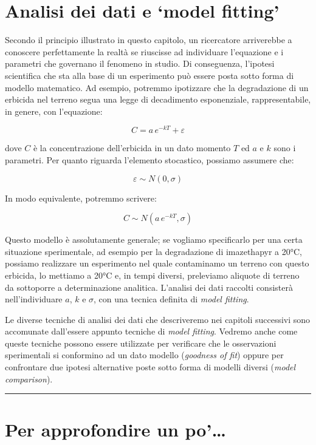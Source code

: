 \documentclass[a4paper,12pt,oneside]{book}
\begin{document}
\hypertarget{analisi-dei-dati-e-model-fitting}{%
\section{Analisi dei dati e `model fitting'}\label{analisi-dei-dati-e-model-fitting}}

Secondo il principio illustrato in questo capitolo, un ricercatore arriverebbe a conoscere perfettamente la realtà se riuscisse ad individuare l'equazione e i parametri che governano il fenomeno in studio. Di conseguenza, l'ipotesi scientifica che sta alla base di un esperimento può essere posta sotto forma di modello matematico. Ad esempio, potremmo ipotizzare che la degradazione di un erbicida nel terreno segua una legge di decadimento esponenziale, rappresentabile, in genere, con l'equazione:

\[ C= a \, e^{-k T} + \varepsilon\]

dove \(C\) è la concentrazione dell'erbicida in un dato momento \(T\) ed \(a\) e \(k\) sono i parametri. Per quanto riguarda l'elemento stocastico, possiamo assumere che:

\[ \varepsilon \sim N(0, \sigma)\]

In modo equivalente, potremmo scrivere:

\[ C \sim N(a \, e^{-k T}, \sigma)\]

Questo modello è assolutamente generale; se vogliamo specificarlo per una certa situazione sperimentale, ad esempio per la degradazione di imazethapyr a 20°C, possiamo realizzare un esperimento nel quale contaminamo un terreno con questo erbicida, lo mettiamo a 20°C e, in tempi diversi, preleviamo aliquote di terreno da sottoporre a determinazione analitica. L'analisi dei dati raccolti consisterà nell'individuare \(a\), \(k\) e \(\sigma\), con una tecnica definita di \emph{model fitting}.

Le diverse tecniche di analisi dei dati che descriveremo nei capitoli successivi sono accomunate dall'essere appunto tecniche di \emph{model fitting}. Vedremo anche come queste tecniche possono essere utilizzate per verificare che le osservazioni sperimentali si conformino ad un dato modello (\emph{goodness of fit}) oppure per confrontare due ipotesi alternative poste sotto forma di modelli diversi (\emph{model comparison}).

\begin{center}\rule{0.5\linewidth}{\linethickness}\end{center}

\hypertarget{per-approfondire-un-po-2}{%
\section{Per approfondire un po'\ldots{}}\label{per-approfondire-un-po-2}}
\end{document}
